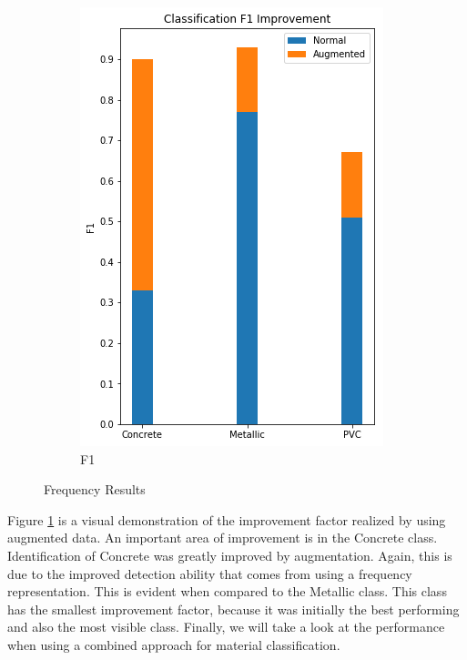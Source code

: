 \begin{figure}[H]
\begin{subfigure}[b]{0.4\linewidth}
    \includegraphics[width=\linewidth]{figures/Frequency-F1.png}
    \caption{F1}
  \end{subfigure}
  \caption{Frequency Results}
  \label{fig:freq-results}
\end{figure}

Figure \ref{fig:freq-results} is a visual demonstration of the improvement factor realized by using augmented data. An important area of improvement is in the Concrete class. Identification of Concrete was greatly improved by augmentation. Again, this is due to the improved detection ability that comes from using a frequency representation. This is evident when compared to the Metallic class. This class has the smallest improvement factor, because it was initially the best performing and also the most visible class. Finally, we will take a look at the performance when using a combined approach for material classification. 


